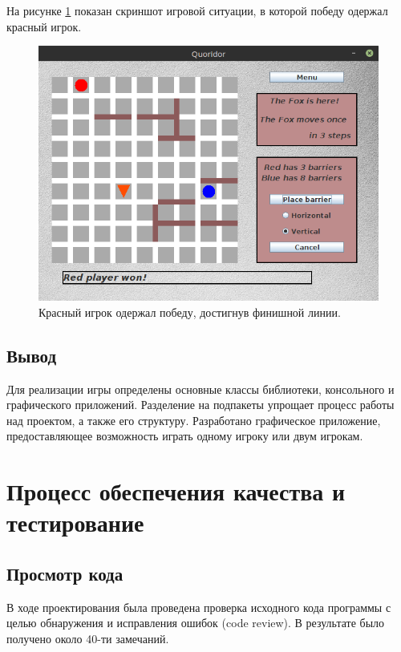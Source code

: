 \documentclass[a4paper]{article}
\begin{document}
На рисунке \ref{pic:gameGUI3} показан скриншот игровой ситуации, в которой победу одержал красный игрок.

\begin{figure}[H]
	\begin{center}
		\includegraphics[scale=0.5]{gameGUI3}
		\caption{Красный игрок одержал победу, достигнув финишной линии.} 
		\label{pic:gameGUI3} %
	\end{center}
\end{figure}

\subsection{Вывод}
Для реализации игры определены основные классы библиотеки, консольного и графического приложений. Разделение на подпакеты упрощает процесс работы над проектом, а также его структуру. Разработано графическое приложение, предоставляющее возможность играть одному игроку или двум игрокам.

\section{Процесс обеспечения качества и тестирование}
\subsection{Просмотр кода}
В ходе проектирования была проведена проверка исходного кода программы с целью обнаружения и исправления ошибок (code review). В результате было получено около 40-ти замечаний.
\end{document}
